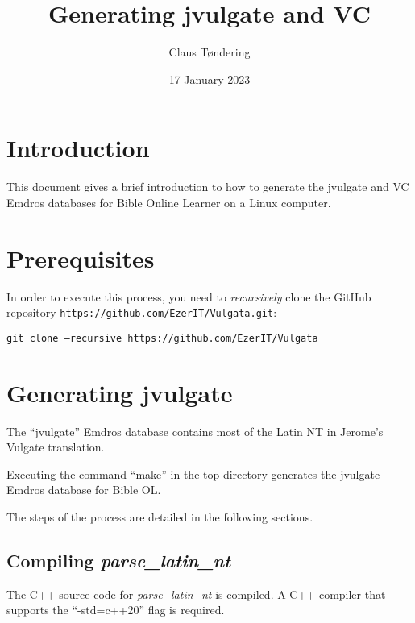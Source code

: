 \documentclass[11pt,oneside,a4paper,article]{memoir}
\title{Generating jvulgate and VC}
\author{Claus Tøndering}
\date{17 January 2023}
\begin{document}
\maketitle


\chapter{Introduction}

This document gives a brief introduction to how to generate the jvulgate and VC Emdros databases for Bible
Online Learner on a Linux computer.

\chapter{Prerequisites}

In order to execute this process, you need to \emph{recursively} clone the GitHub repository
\texttt{https://github.com/EzerIT/Vulgata.git}:

\vspace{1ex}

\quad\texttt{git clone --recursive https://github.com/EzerIT/Vulgata}

\vspace{1ex}



\chapter{Generating jvulgate}

The ``jvulgate'' Emdros database contains most of the Latin NT in Jerome's Vulgate translation.

Executing the command ``make'' in the top directory generates the jvulgate Emdros database for Bible
OL.

The steps of the process are detailed in the following sections.


\section{Compiling \emph{parse\_latin\_nt}}

The C++ source code for \emph{parse\_latin\_nt} is compiled. A C++ compiler that supports the
``-std=c++20'' flag is required.
\end{document}
